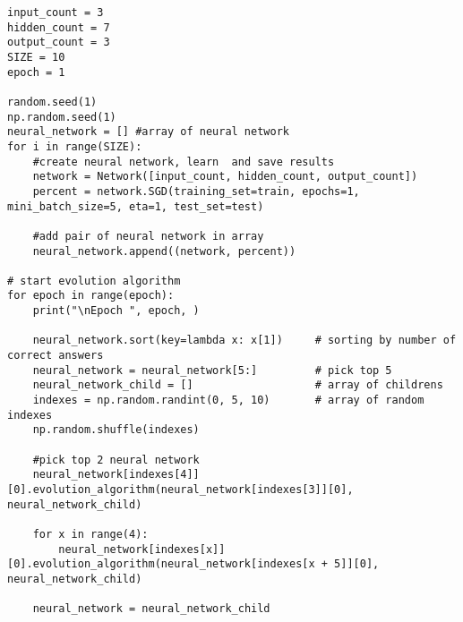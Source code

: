 \begin{lstlisting}
input_count = 3
hidden_count = 7
output_count = 3
SIZE = 10
epoch = 1

random.seed(1)
np.random.seed(1)
neural_network = [] #array of neural network
for i in range(SIZE):
    #create neural network, learn  and save results
    network = Network([input_count, hidden_count, output_count])  
    percent = network.SGD(training_set=train, epochs=1, mini_batch_size=5, eta=1, test_set=test)
    
    #add pair of neural network in array
    neural_network.append((network, percent))

# start evolution algorithm 
for epoch in range(epoch):
    print("\nEpoch ", epoch, )
    
    neural_network.sort(key=lambda x: x[1])     # sorting by number of correct answers
    neural_network = neural_network[5:]         # pick top 5
    neural_network_child = []                   # array of childrens
    indexes = np.random.randint(0, 5, 10)       # array of random indexes
    np.random.shuffle(indexes)
    
    #pick top 2 neural network
    neural_network[indexes[4]][0].evolution_algorithm(neural_network[indexes[3]][0], neural_network_child)
    
    for x in range(4):
        neural_network[indexes[x]][0].evolution_algorithm(neural_network[indexes[x + 5]][0], neural_network_child)

    neural_network = neural_network_child
\end{lstlisting}